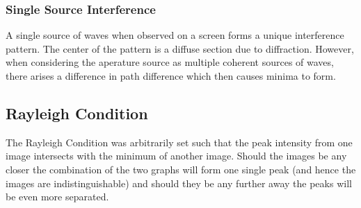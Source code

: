 \documentclass[../main]{subfiles}
\begin{document}
	\subsubsection{Single Source Interference}

	A single source of waves when observed on a screen forms a unique interference pattern. The center of the pattern is a diffuse section due to diffraction. However, when considering the aperature source as multiple coherent sources of waves, there arises a difference in path difference which then causes minima to form. 

	
	\subsection{Rayleigh Condition}



	The Rayleigh Condition was arbitrarily set such that the peak intensity from one image intersects with the minimum of another image. Should the images be any closer the combination of the two graphs will form one single peak (and hence the images are indistinguishable) and should they be any further away the peaks will be even more separated.
\end{document}
